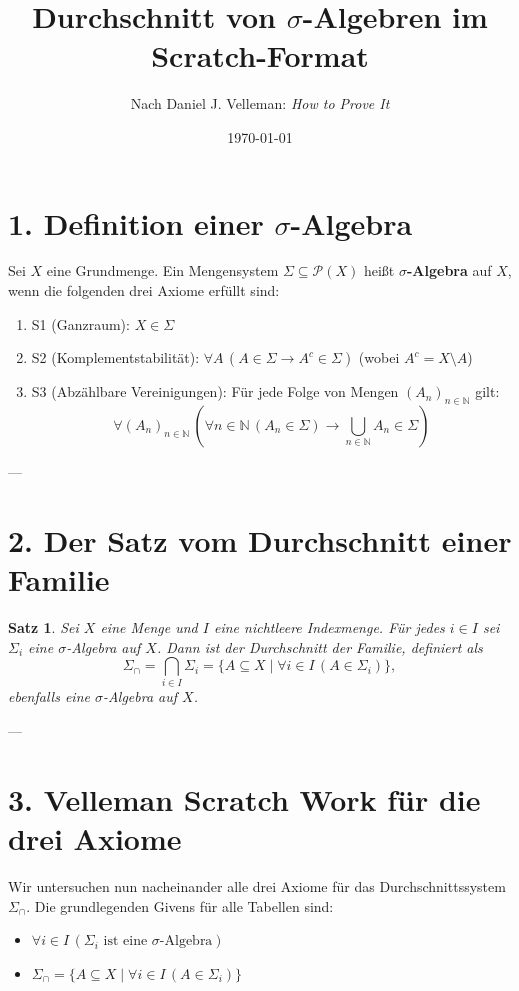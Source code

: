\documentclass{article}
\title{Durchschnitt von $\sigma$-Algebren im Scratch-Format}
\author{Nach Daniel J. Velleman: \emph{How to Prove It}}
\date{\today}
\newtheorem{theorem}{Satz}
\begin{document}
\maketitle

\section*{1. Definition einer $\sigma$-Algebra}

Sei $X$ eine Grundmenge. Ein Mengensystem $\Sigma \subseteq \mathcal{P}(X)$ heißt \textbf{$\sigma$-Algebra} auf $X$, wenn die folgenden drei Axiome erfüllt sind:
\begin{enumerate}
    \item S1 (Ganzraum): $X \in \Sigma$
    \item S2 (Komplementstabilität): $\forall A \, (A \in \Sigma \rightarrow A^c \in \Sigma)$ \quad (wobei $A^c = X \setminus A$)
    \item S3 (Abzählbare Vereinigungen): Für jede Folge von Mengen $(A_n)_{n \in \mathbb{N}}$ gilt:
    \[ \forall (A_n)_{n \in \mathbb{N}} \, \left( \forall n \in \mathbb{N} \, (A_n \in \Sigma) \rightarrow \bigcup_{n \in \mathbb{N}} A_n \in \Sigma \right) \]
\end{enumerate}

---

\section*{2. Der Satz vom Durchschnitt einer Familie}

\begin{theorem}
Sei $X$ eine Menge und $I$ eine nichtleere Indexmenge. Für jedes $i \in I$ sei $\Sigma_i$ eine $\sigma$-Algebra auf $X$. Dann ist der Durchschnitt der Familie, definiert als
\[
\Sigma_{\cap} = \bigcap_{i \in I} \Sigma_i = \{ A \subseteq X \mid \forall i \in I \, (A \in \Sigma_i) \},
\]
ebenfalls eine $\sigma$-Algebra auf $X$.
\end{theorem}

---

\section*{3. Velleman Scratch Work für die drei Axiome}

Wir untersuchen nun nacheinander alle drei Axiome für das Durchschnittssystem $\Sigma_{\cap}$. Die grundlegenden Givens für alle Tabellen sind:
\begin{itemize}
    \item[G1:] $\forall i \in I \, (\Sigma_i \text{ ist eine } \sigma\text{-Algebra})$
    \item[G2:] $\Sigma_{\cap} = \{ A \subseteq X \mid \forall i \in I \, (A \in \Sigma_i) \}$
\end{itemize}
\end{document}

